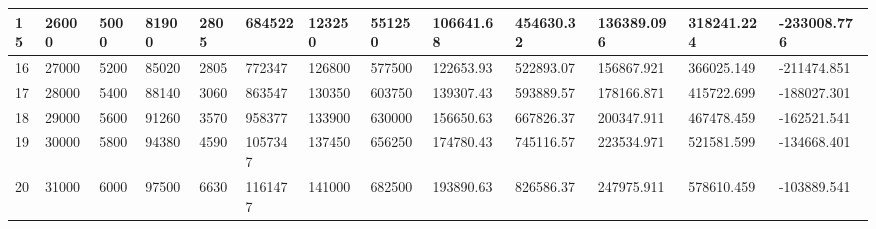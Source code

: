 \begin{table}[]
{\begin{tabular}{|l|l|l|l|l|l|l|l|l|l|l|l|l|}
        15    & 26000     & 5000          & 81900                                                 & 2805                                                           & 684522                                                   & 123250                                                     & 551250                                                          & 106641.68  & 454630.32   & 136389.096    & 318241.224       & -233008.776     \\ \hline
        16    & 27000     & 5200          & 85020                                                 & 2805                                                           & 772347                                                   & 126800                                                     & 577500                                                          & 122653.93  & 522893.07   & 156867.921    & 366025.149       & -211474.851     \\ \hline
        17    & 28000     & 5400          & 88140                                                 & 3060                                                           & 863547                                                   & 130350                                                     & 603750                                                          & 139307.43  & 593889.57   & 178166.871    & 415722.699       & -188027.301     \\ \hline
        18    & 29000     & 5600          & 91260                                                 & 3570                                                           & 958377                                                   & 133900                                                     & 630000                                                          & 156650.63  & 667826.37   & 200347.911    & 467478.459       & -162521.541     \\ \hline
        19    & 30000     & 5800          & 94380                                                 & 4590                                                           & 1057347                                                  & 137450                                                     & 656250                                                          & 174780.43  & 745116.57   & 223534.971    & 521581.599       & -134668.401     \\ \hline
        20    & 31000     & 6000          & 97500                                                 & 6630                                                           & 1161477                                                  & 141000                                                     & 682500                                                          & 193890.63  & 826586.37   & 247975.911    & 578610.459       & -103889.541     \\ \hline

\end{tabular}}
\end{table}
